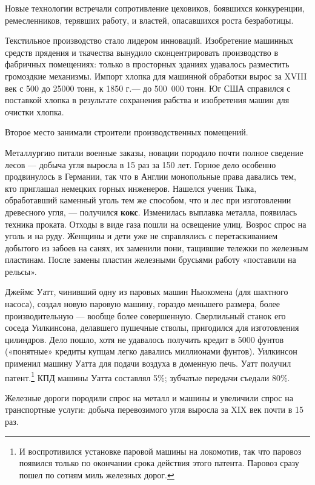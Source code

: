 Новые технологии встречали сопротивление цеховиков, боявшихся конкуренции, ремесленников, терявших работу, и властей,
опасавшихся роста безработицы.


Текстильное производство стало лидером инноваций. Изобретение машинных средств прядения и ткачества вынудило
сконцентрировать производство в фабричных помещениях: только в просторных зданиях удавалось разместить громоздкие
механизмы. Импорт хлопка для машинной обработки вырос за \foreignlanguage{english}{XVIII} век с 500 до 25000 тонн, к
1850 г.— до 500~000 тонн. Юг США справился с поставкой хлопка в результате сохранения рабства и изобретения машин для
очистки хлопка.


Второе место занимали строители производственных помещений.


Металлургию питали военные заказы, новации породило почти полное сведение лесов — добыча угля выросла в 15 раз за 150
лет. Горное дело особенно продвинулось в Германии, так что в Англии монопольные права давались тем, кто приглашал
немецких горных инженеров. Нашелся ученик Тыка, обработавший каменный уголь тем же способом, что и лес при изготовлении
древесного угля, — получился \textbf{кокс}. Изменилась выплавка металла, появилась техника проката. Отходы в виде газа
пошли на освещение улиц. Возрос спрос на уголь и на руду. Женщины и дети уже не справлялись с перетаскиванием добытого
из забоев на санях, их заменили пони, тащившие тележки по железным пластинам. После замены пластин железными брусьями
работу «поставили на рельсы».


Джеймс Уатт, чинивший одну из паровых машин Ньюкомена (для шахтного насоса), создал новую паровую машину, гораздо
меньшего размера, более производительную — вообще более совершенную. Сверлильный станок его соседа Уилкинсона,
делавшего пушечные стволы, пригодился для изготовления цилиндров. Дело пошло, хотя не удавалось получить кредит в 5000
фунтов («понятные» кредиты купцам легко давались миллионами фунтов). Уилкинсон применил машину Уатта для подачи воздуха
в доменную печь. Уатт получил патент.\footnote{И воспротивился установке паровой машины на локомотив,
так что паровоз появился только по окончании срока действия этого патента. Паровоз сразу пошел по сотням миль железных
дорог.} КПД машины Уатта составлял 5\%; зубчатые передачи съедали 80\%.


Железные дороги породили спрос на металл и машины и увеличили спрос на транспортные услуги: добыча перевозимого угля
выросла за \foreignlanguage{english}{XIX} век почти в 15 раз.


